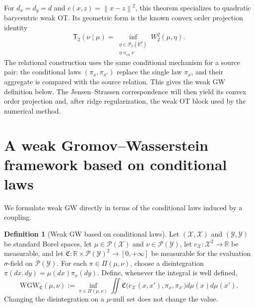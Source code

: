 \documentclass[11pt]{article}
\newcommand{\R}{\mathbb R}
\newcommand{\cP}{\mathcal P}
\newcommand{\norm}[1]{\left\lVert #1\right\rVert}
\newcommand{\cx}{\preceq_{\mathrm{cx}}}
\newcommand{\WGW}{\mathrm{WGW}}
\theoremstyle{plain}
\theoremstyle{definition}
\newtheorem{definition}[theorem]{Definition}
\theoremstyle{remark}
\begin{document}
For $d_x=d_y=d$ and $c(x,z)=\norm{x-z}^2$, this theorem specializes to quadratic
barycentric weak OT. Its geometric form is the known convex order projection
identity \cite{GozlanJuillet}
\begin{equation}\label{eq:wot-projection-blueprint}
 \mathsf T_2(\nu\mid\mu)
 =\inf_{\substack{\eta\in\cP_2(\R^d)\\\eta\cx\nu}}W_2^2(\mu,\eta).
\end{equation}
The relational construction uses the same conditional mechanism for a source pair:
the conditional laws $(\pi_x,\pi_{x'})$ replace the single law $\pi_x$, and their aggregate is
compared with the source relation. This gives the weak GW definition below. The
Jensen--Strassen correspondence will then yield its convex order projection and,
after ridge regularization, the weak OT block used by the numerical method.

\section{A weak Gromov--Wasserstein framework based on conditional laws}
\label{sec:weak-gw-framework}

We formulate weak GW directly in terms of the conditional laws induced by a
coupling.

\begin{definition}[Weak GW based on conditional laws]\label{def:generic-wgw}
Let $(\mathcal X,\mathscr X)$ and $(\mathcal Y,\mathscr Y)$ be standard Borel
spaces, let $\mu\in\cP(\mathcal X)$ and $\nu\in\cP(\mathcal Y)$, let
$c_{\mathcal X}:\mathcal X^2\to\R$ be measurable, and let
$\mathfrak C:\R\times\cP(\mathcal Y)^2\to[0,+\infty]$ be measurable for the
evaluation $\sigma$-field on $\cP(\mathcal Y)$. For each
$\pi\in\Pi(\mu,\nu)$, choose a disintegration
$\pi(dx,dy)=\mu(dx)\pi_x(dy)$. Define, whenever the integral is well defined,
\begin{equation}\label{eq:generic-wgw-definition}
  \WGW_{\mathfrak C}(\mu,\nu)
  :=\inf_{\pi\in\Pi(\mu,\nu)}
  \iint \mathfrak C\big(c_{\mathcal X}(x,x'),\pi_x,\pi_{x'}\big)
  d\mu(x)d\mu(x').
\end{equation}
Changing the disintegration on a $\mu$-null set does not change the value.
\end{definition}
\end{document}
